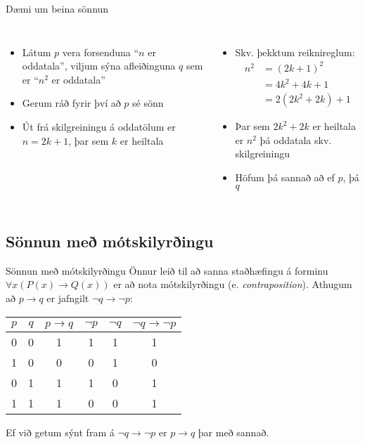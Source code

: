 \documentclass{beamer}
\begin{document}
\begin{frame}{Dæmi um beina sönnun}
    \begin{columns}
        \begin{itemize}[<+->]
            \item Látum $p$ vera forsenduna ``$n$ er oddatala'', viljum sýna afleiðinguna $q$ sem er ``$n^2$ er oddatala''
            \item Gerum ráð fyrir því að $p$ sé sönn
            \item Út frá skilgreiningu á oddatölum er $n = 2k+1$, þar sem $k$ er heiltala
        \end{itemize}
        \begin{itemize}[<+->]
            \item Skv. þekktum reiknireglum:
            \begin{align*}
                n^2 &= (2k+1)^2\\
                &=4k^2+4k+1\\
                &=2(2k^2+2k)+1
            \end{align*}
            \item Þar sem $2k^2+2k$ er heiltala er $n^2$ þá oddatala skv. skilgreiningu
            \item Höfum þá sannað að ef $p$, þá $q$
        \end{itemize}
    \end{columns}
\end{frame}

\subsection{Sönnun með mótskilyrðingu}

\begin{frame}{Sönnun með mótskilyrðingu}
    Önnur leið til að sanna staðhæfingu á forminu $\forall x (P(x) \to Q(x))$ er að nota mótskilyrðingu (e. \emph{contraposition}). Athugum að $p \to q$ er jafngilt $\lnot q \to \lnot p$:
    \begin{center}
        \begin{tabular}{cccccc}
            \toprule
            $p$&$q$&$p \to q$&$\lnot p$&$\lnot q$&$\lnot q \to \lnot p$\\
            \midrule
            0&0&1&1&1&1\\
            1&0&0&0&1&0\\
            0&1&1&1&0&1\\
            1&1&1&0&0&1\\
            \bottomrule
        \end{tabular}
    \end{center}
    Ef við getum sýnt fram á $\lnot q \to \lnot p$ er $p \to q$ þar með sannað.
\end{frame}
\end{document}
